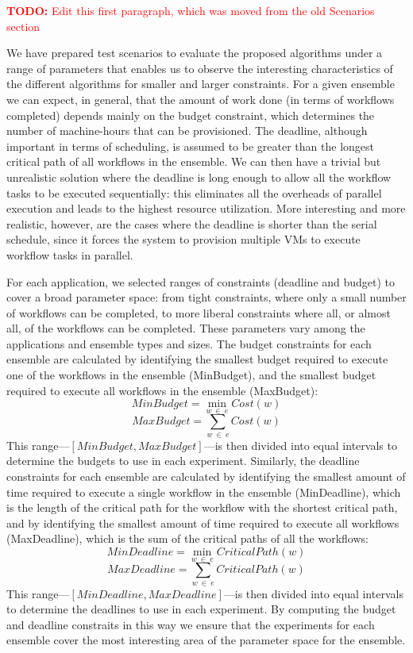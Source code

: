\documentclass[conference]{IEEEtran}
\newcommand{\TODO}[1]{
  {\Large \textcolor{red}{\textbf{TODO: }#1}}
}
\begin{document}
\TODO{Edit this first paragraph, which was moved from the old Scenarios section}

We have prepared test scenarios to evaluate the proposed algorithms under a
range of parameters that enables us to observe the interesting characteristics
of the different algorithms for smaller and larger constraints. For a given
ensemble we can expect, in general, that the amount of work done (in terms of
workflows completed) depends mainly on the budget constraint, which determines
the number of machine-hours that can be provisioned. The deadline, although
important in terms of scheduling, is assumed to be greater than the longest critical
path of all workflows in the ensemble. We can then have a trivial but unrealistic solution
where the deadline  is long enough to allow all the workflow tasks to be
executed sequentially: this eliminates all the overheads of parallel execution
and leads to the highest resource utilization. More interesting and more
realistic, however, are the cases where the deadline is shorter than the serial
schedule, since it forces the system to provision multiple VMs to execute
workflow tasks in parallel.

For each application, we selected ranges of constraints (deadline and budget) to cover a broad parameter space: from tight constraints, where only a small number of workflows can be completed, to more liberal constraints where all, or almost all, of the workflows can be completed. These parameters vary among the applications and ensemble types and sizes. The budget constraints for each ensemble are calculated by identifying the smallest budget required to execute one of the workflows in the ensemble (MinBudget), and the smallest budget required to execute all workflows in the ensemble (MaxBudget): 
%
$$
MinBudget = \min_{w\ \in\ e}{Cost(w)}
$$
$$
MaxBudget = \sum_{w\ \in\ e}{Cost(w)}
$$
%
This range---$[MinBudget, MaxBudget]$---is then divided into equal intervals to determine the budgets to use in each experiment. Similarly, the deadline constraints for each ensemble are calculated by identifying the smallest amount of time required to execute a single workflow in the ensemble (MinDeadline), which is the length of the critical path for the workflow with the shortest critical path, and by identifying the smallest amount of time required to execute all workflows (MaxDeadline), which is the sum of the critical paths of all the workflows:
%
$$
MinDeadline = \min_{w\ \in\ e}{CriticalPath(w)}
$$
$$
MaxDeadline = \sum_{w\ \in\ e}{CriticalPath(w)}
$$
%
This range---$[MinDeadline, MaxDeadline]$---is then divided into equal intervals to determine the deadlines to use in each experiment. By computing the budget and deadline constraits in this way we ensure that the experiments for each ensemble cover the most interesting area of the parameter space for the ensemble.
\end{document}
